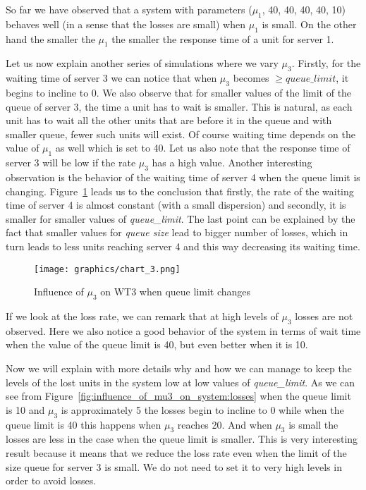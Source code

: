 \documentclass[12pt]{article}
\theoremstyle{plain}
\begin{document}
So far we have observed that a system with parameters ($\mu_1$, 40, 40, 40,
40, 10) behaves well (in a sense that the losses are small) when $\mu_1$ is small.
On the other hand the smaller the $\mu_1$ the smaller the response time of a unit
for server 1.

Let us now explain another series of simulations where we vary $\mu_3$. Firstly, for the waiting time
of server 3 we can notice that when $\mu_3$ becomes $\ge queue\_limit$, it begins
to incline to 0. We also observe that for smaller values of the limit of the queue
of server 3, the time a unit has to wait is smaller. This is natural, as each
unit has to wait all the other units that are before it in the queue and with
smaller queue, fewer such units will exist. Of course waiting time depends on the
value of $\mu_1$ as well which is set to 40. Let us also note that the response time of server 3 will be
low if the rate $\mu_3$ has a high value. Another interesting observation is the behavior
of the waiting time of server 4 when the queue limit is changing.
Figure~\ref{fig:influence_of_mu3_on_wt3_when_queue_limit_changes} leads
us to the conclusion that firstly, the rate of the waiting time of server 4 is almost
constant (with a small dispersion) and secondly, it is smaller for smaller values
of \emph{queue\_limit}. The last point can be explained by the fact that smaller values
for \emph{queue size} lead to bigger number of losses, which in turn leads to
less units reaching server 4 and this way decreasing its waiting time.

\begin{figure}
  \caption{Influence of $\mu_3$ on WT3 when queue limit changes}
  \texttt{[image: graphics/chart\_3.png]}\\
  \label{fig:influence_of_mu3_on_wt3_when_queue_limit_changes}
\end{figure}

If we look at the loss rate, we can remark that at high levels of $\mu_3$ losses
are not observed. Here we also notice a good behavior of the system in terms of
wait time when the value of the queue limit is 40, but even better when it is
10.  

Now we will explain with more details why and how we can manage to keep the
levels of the lost units in the system low at low values of \emph{queue\_limit}.
As we can see from Figure~\ref{fig:influence_of_mu3_on_system:losses} when the
queue limit is 10 and $\mu_3$ is approximately 5 the losses begin to incline to 0
while when the queue limit is 40 this happens when $\mu_3$ reaches 20. And when
$\mu_3$ is small the losses are less in the case when the queue limit is
smaller. This is very interesting result because it means that we reduce
the loss rate even when the limit of the size queue for server 3 is small. We
do not need to set it to very high levels in order to avoid losses.  
\end{document}
